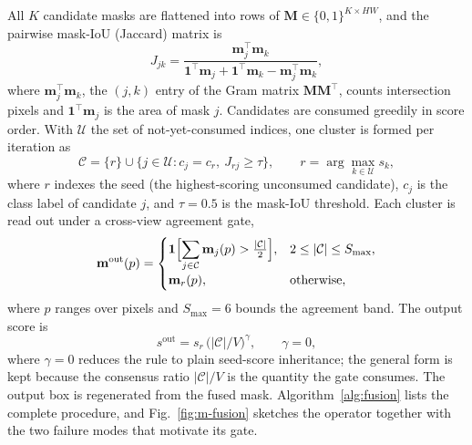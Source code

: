 All $K$ candidate masks are flattened into rows of $\mathbf{M}\in\{0,1\}^{K\times HW}$, and the pairwise mask-IoU (Jaccard) matrix is
\begin{equation}\label{eq:iou}
J_{jk}=\frac{\mathbf{m}_j^{\top}\mathbf{m}_k}
{\mathbf{1}^{\top}\mathbf{m}_j+\mathbf{1}^{\top}\mathbf{m}_k-\mathbf{m}_j^{\top}\mathbf{m}_k},
\end{equation}
where $\mathbf{m}_j^{\top}\mathbf{m}_k$, the $(j,k)$ entry of the Gram matrix $\mathbf{M}\mathbf{M}^{\top}$, counts intersection pixels and $\mathbf{1}^{\top}\mathbf{m}_j$ is the area of mask $j$. Candidates are consumed greedily in score order. With $\mathcal{U}$ the set of not-yet-consumed indices, one cluster is formed per iteration as
\begin{equation}\label{eq:cluster}
\mathcal{C}=\{r\}\cup\bigl\{j\in\mathcal{U}: c_j=c_r,\ J_{rj}\ge\tau\bigr\},
\qquad r=\arg\max_{k\in\mathcal{U}}s_k,
\end{equation}
where $r$ indexes the seed (the highest-scoring unconsumed candidate), $c_j$ is the class label of candidate $j$, and $\tau=0.5$ is the mask-IoU threshold. Each cluster is read out under a cross-view agreement gate,
\begin{equation}\label{eq:fuse}
\mathbf{m}^{\mathrm{out}}(p)=
\begin{cases}
\mathbf{1}\Bigl[\displaystyle\sum_{j\in\mathcal{C}}\mathbf{m}_j(p)>\tfrac{|\mathcal{C}|}{2}\Bigr],
& 2\le|\mathcal{C}|\le S_{\max},\\[8pt]
\mathbf{m}_r(p), & \text{otherwise},
\end{cases}
\end{equation}
where $p$ ranges over pixels and $S_{\max}=6$ bounds the agreement band. The output score is
\begin{equation}\label{eq:score}
s^{\mathrm{out}}=s_r\,\bigl(|\mathcal{C}|/V\bigr)^{\gamma},
\qquad \gamma=0,
\end{equation}
where $\gamma=0$ reduces the rule to plain seed-score inheritance; the general form is kept because the consensus ratio $|\mathcal{C}|/V$ is the quantity the gate consumes. The output box is regenerated from the fused mask. Algorithm~\ref{alg:fusion} lists the complete procedure, and Fig.~\ref{fig:m-fusion} sketches the operator together with the two failure modes that motivate its gate.

